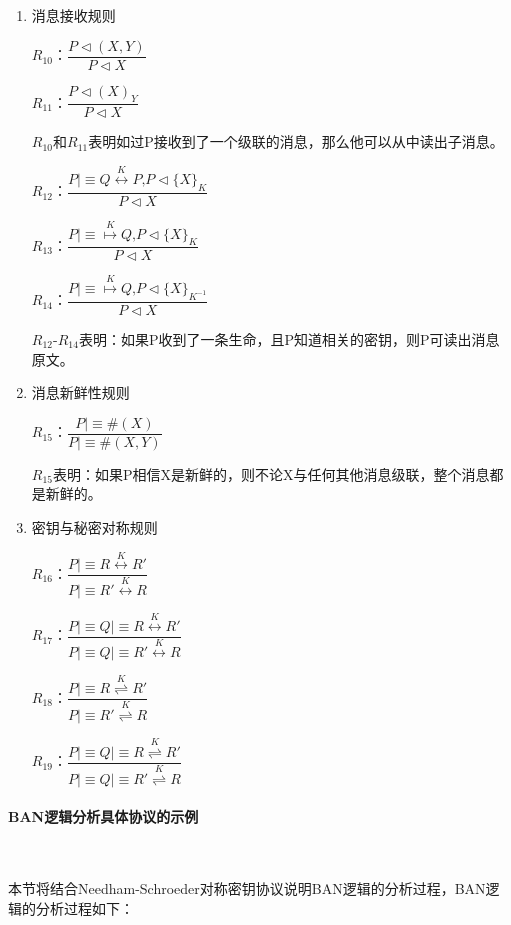 \documentclass[cs4size,a4pape,UTF8]{ctexart}
\numberwithin{equation}{section}
\numberwithin{table}{section}
\numberwithin{figure}{section}
\begin{document}
\begin{enumerate}[(1)]
\item 消息接收规则

$R_{10}$：$\dfrac{P{\triangleleft}(X,Y)}{P{\triangleleft}X}$

$R_{11}$：$\dfrac{P{\triangleleft}(X)_Y}{P{\triangleleft}X}$

$R_{10}$和$R_{11}$表明如过P接收到了一个级联的消息，那么他可以从中读出子消息。

$R_{12}$：$\dfrac{P{\lvert\equiv}Q\stackrel{K}{\longleftrightarrow}P\textrm{,}P\triangleleft\{X\}_{K}}{P{\triangleleft}X}$

$R_{13}$：$\dfrac{P{\lvert\equiv}\stackrel{K}{\mapsto}Q\textrm{,} P\triangleleft\{X\}_{K}}{P{\triangleleft}X}$

$R_{14}$：$\dfrac{P{\lvert\equiv}\stackrel{K}{\mapsto}Q\textrm{,} P\triangleleft\{X\}_{K^{-1}}}{P{\triangleleft}X}$

$R_{12}$-$R_{14}$表明：如果P收到了一条生命，且P知道相关的密钥，则P可读出消息原文。

\item 消息新鲜性规则

$R_{15}$：$\dfrac{P{\lvert\equiv}\#(X)}{P{\lvert\equiv}\#(X,Y)}$

$R_{15}$表明：如果P相信X是新鲜的，则不论X与任何其他消息级联，整个消息都是新鲜的。

\item 密钥与秘密对称规则

$R_{16}$：$\dfrac{P{\lvert\equiv}R\stackrel{K}{\longleftrightarrow}R'}{P{\lvert\equiv}R'\stackrel{K}{\longleftrightarrow}R}$

$R_{17}$：$\dfrac{P{\lvert\equiv}Q{\lvert\equiv}R\stackrel{K}{\longleftrightarrow}R'}{P{\lvert\equiv}Q{\lvert\equiv}R'\stackrel{K}{\longleftrightarrow}R}$

$R_{18}$：$\dfrac{P{\lvert\equiv}R\stackrel{K}{\rightleftharpoons}R'}{P{\lvert\equiv}R'\stackrel{K}{\rightleftharpoons}R}$

$R_{19}$：$\dfrac{P{\lvert\equiv}Q{\lvert\equiv}R\stackrel{K}{\rightleftharpoons}R'}{P{\lvert\equiv}Q{\lvert\equiv}R'\stackrel{K}{\rightleftharpoons}R}$

\end{enumerate}

\paragraph{BAN逻辑分析具体协议的示例}\

本节将结合Needham-Schroeder对称密钥协议说明BAN逻辑的分析过程，BAN逻辑的分析过程如下： 
\end{document}
